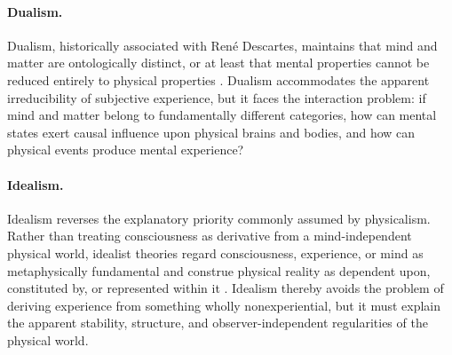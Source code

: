 \paragraph{Dualism.}
Dualism, historically associated with Ren\'e Descartes, maintains that mind and
matter are ontologically distinct, or at least that mental properties cannot be
reduced entirely to physical properties
\cite{descartes1641meditations,robinson2023dualism}. Dualism accommodates the
apparent irreducibility of subjective experience, but it faces the interaction
problem: if mind and matter belong to fundamentally different categories, how can
mental states exert causal influence upon physical brains and bodies, and how can
physical events produce mental experience?

\paragraph{Idealism.}
Idealism reverses the explanatory priority commonly assumed by physicalism.
Rather than treating consciousness as derivative from a mind-independent physical
world, idealist theories regard consciousness, experience, or mind as
metaphysically fundamental and construe physical reality as dependent upon,
constituted by, or represented within it \cite{chalmers2019idealism}. Idealism
thereby avoids the problem of deriving experience from something wholly
nonexperiential, but it must explain the apparent stability, structure, and
observer-independent regularities of the physical world.


